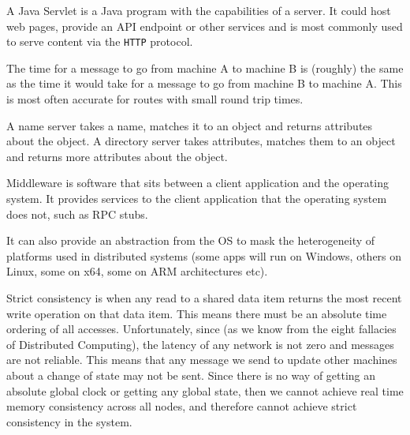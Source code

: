 
A Java Servlet is a Java program with the capabilities of a server. It could
host web pages, provide an API endpoint or other services and is most commonly
used to serve content via the \texttt{HTTP} protocol.


The time for a message to go from machine A to machine B is (roughly) the same
as the time it would take for a message to go from machine B to machine A. This
is most often accurate for routes with small round trip times.


A name server takes a name, matches it to an object and returns attributes about
the object. A directory server takes attributes, matches them to an object and
returns more attributes about the object.


Middleware is software that sits between a client application and the operating
system. It provides services to the client application that the operating system
does not, such as RPC stubs.

It can also provide an abstraction from the OS to mask the heterogeneity of
platforms used in distributed systems (some apps will run on Windows, others on
Linux, some on x64, some on ARM architectures etc).


Strict consistency is when any read to a shared data item returns the most
recent write operation on that data item. This means there must be an absolute
time ordering of all accesses. Unfortunately, since (as we know from the eight
fallacies of Distributed Computing), the latency of any network is not zero and
messages are not reliable. This means that any message we send to update other
machines about a change of state may not be sent. Since there is no way of
getting an absolute global clock or getting any global state, then we cannot
achieve real time memory consistency across all nodes, and therefore cannot
achieve strict consistency in the system.


